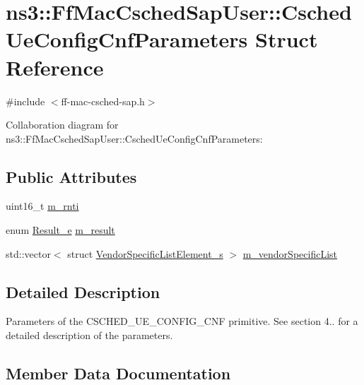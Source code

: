 \hypertarget{structns3_1_1FfMacCschedSapUser_1_1CschedUeConfigCnfParameters}{}\section{ns3\+:\+:Ff\+Mac\+Csched\+Sap\+User\+:\+:Csched\+Ue\+Config\+Cnf\+Parameters Struct Reference}
\label{structns3_1_1FfMacCschedSapUser_1_1CschedUeConfigCnfParameters}


{\ttfamily \#include $<$ff-\/mac-\/csched-\/sap.\+h$>$}



Collaboration diagram for ns3\+:\+:Ff\+Mac\+Csched\+Sap\+User\+:\+:Csched\+Ue\+Config\+Cnf\+Parameters\+:
\subsection*{Public Attributes}
\begin{DoxyCompactItemize}
\item 
uint16\+\_\+t \hyperlink{structns3_1_1FfMacCschedSapUser_1_1CschedUeConfigCnfParameters_a8cff26ac831092181fded525a0968d7d}{m\+\_\+rnti}
\item 
enum \hyperlink{namespacens3_a7acf2b7f9e0781dfe43a6bc54d6ecd07}{Result\+\_\+e} \hyperlink{structns3_1_1FfMacCschedSapUser_1_1CschedUeConfigCnfParameters_add8e213a5f2e57ee0b72758e80ec6b7e}{m\+\_\+result}
\item 
std\+::vector$<$ struct \hyperlink{structns3_1_1VendorSpecificListElement__s}{Vendor\+Specific\+List\+Element\+\_\+s} $>$ \hyperlink{structns3_1_1FfMacCschedSapUser_1_1CschedUeConfigCnfParameters_a1fae6955aba8aeb092b2f31bfc8cdfee}{m\+\_\+vendor\+Specific\+List}
\end{DoxyCompactItemize}


\subsection{Detailed Description}
Parameters of the C\+S\+C\+H\+E\+D\+\_\+\+U\+E\+\_\+\+C\+O\+N\+F\+I\+G\+\_\+\+C\+NF primitive. See section 4.. for a detailed description of the parameters. 

\subsection{Member Data Documentation}
